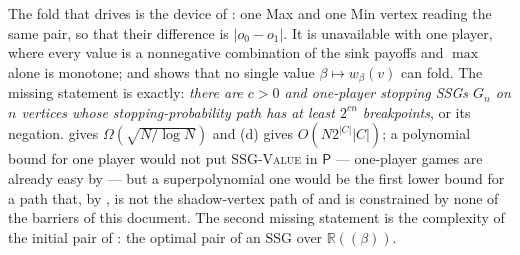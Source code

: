 \begin{remark}\label{pp:gap}
The fold that drives  is the device of : one Max
and one Min vertex reading the same pair, so that their difference is
$|o_0-o_1|$. It is unavailable with one player, where every value is a
nonnegative combination of the sink payoffs and $\max$ alone is monotone; and
 shows that no single value $\beta\mapsto w_\beta(v)$ can fold.
The missing statement is exactly: \emph{there are $c>0$ and one-player stopping
SSGs $G_n$ on $n$ vertices whose stopping-probability path has at least $2^{cn}$
breakpoints}, or its negation.  gives $\Omega(\sqrt{N/\log N})$ and
(d) gives $O(N2^{|C|}|C|)$; a polynomial bound for one player
would not put \textsc{SSG-Value} in $\mathsf P$ --- one-player games are already
easy by  --- but a superpolynomial one would be the first
lower bound for a path that, by , is not the shadow-vertex path
of  and is constrained by none of the barriers of this
document. The second missing statement is the complexity of the initial pair of
: the optimal pair of an SSG over $\mathbb R((\beta))$.
\end{remark}

